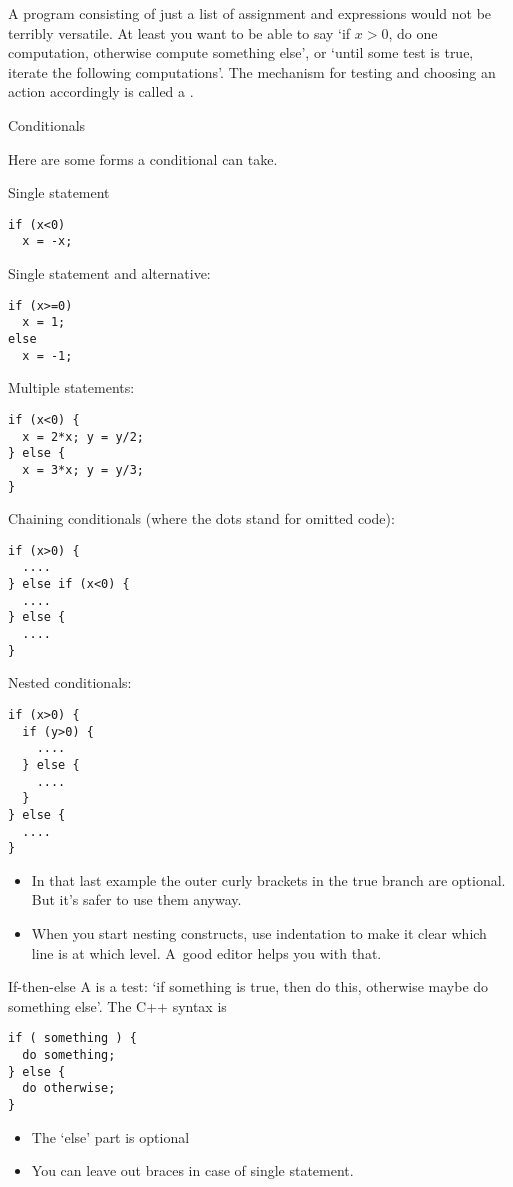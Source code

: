 
A program consisting of just a list of assignment and expressions
would not be terribly versatile. At least you want to be able to say
`if $x>0$, do one computation, otherwise compute something else', or `until some
test is true, iterate the following computations'. The mechanism for
testing and choosing an action accordingly is called a
.

 {Conditionals}
\label{sec:if}

Here are some forms a conditional can take.

Single statement
\begin{lstlisting}
if (x<0)
  x = -x;
\end{lstlisting}
Single statement and alternative:
\begin{lstlisting}
if (x>=0)
  x = 1;
else
  x = -1;
\end{lstlisting}
Multiple statements:
\begin{lstlisting}
if (x<0) {
  x = 2*x; y = y/2;
} else {
  x = 3*x; y = y/3;
}
\end{lstlisting}
Chaining conditionals (where the dots stand for omitted code):
\begin{lstlisting}
if (x>0) {
  ....
} else if (x<0) {
  ....
} else {
  ....
}
\end{lstlisting}
Nested conditionals:
\begin{lstlisting}
if (x>0) {
  if (y>0) {
    ....
  } else {
    ....
  }
} else {
  ....
}
\end{lstlisting}
\begin{itemize}
\item
  In that last example the outer curly brackets in the true branch are
  optional. But it's safer to use them anyway.
\item When you start nesting constructs, use indentation to make it
  clear which line is at which level. A~good editor helps you with that.
\end{itemize}

\begin{slide}{If-then-else}
  \label{sl:ifthenelse}
  A  is a test: `if something is true, then do
  this, otherwise maybe do something else'. The C++ syntax is
\begin{lstlisting}
if ( something ) {
  do something;
} else {
  do otherwise;
}
\end{lstlisting}
\begin{itemize}
\item The `else' part is optional
\item You can leave out braces in case of single statement.
\end{itemize}
\end{slide}

